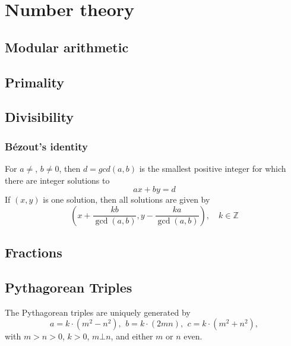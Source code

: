 \chapter{Number theory}

\section{Modular arithmetic}

\section{Primality}

\section{Divisibility}

	\subsection{Bézout's identity}
	For $a \neq $, $b \neq 0$, then $d=gcd(a,b)$ is the smallest positive integer for which there are integer solutions to
	$$ax+by=d$$
	If $(x,y)$ is one solution, then all solutions are given by
	$$\left(x+\frac{kb}{\gcd(a,b)}, y-\frac{ka}{\gcd(a,b)}\right), \quad k\in\mathbb{Z}$$


\section{Fractions}

\section{Pythagorean Triples}
 The Pythagorean triples are uniquely generated by
 \[ a=k\cdot (m^{2}-n^{2}),\ \,b=k\cdot (2mn),\ \,c=k\cdot (m^{2}+n^{2}), \]
 with $m > n > 0$, $k > 0$, $m \bot n$, and either $m$ or $n$ even.

